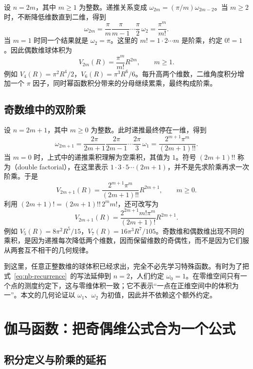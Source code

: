 \documentclass[UTF8]{ctexart}
\begin{document}
设 $n=2m$，其中 $m\geq1$ 为整数。递推关系变成 $\omega_{2m}=(\pi/m)\omega_{2m-2}$。当 $m\geq2$ 时，不断降低维数直到二维，得到
\[
  \omega_{2m}=\frac{\pi}{m}\frac{\pi}{m-1}\cdots
  \frac{\pi}{2}\,\omega_2=\frac{\pi^m}{m!}.
\]
当 $m=1$ 时同一个结果就是 $\omega_2=\pi$。这里的 $m!=1\cdot2\cdots m$ 是阶乘，约定 $0!=1$。因此偶数维球体积为
\begin{equation}\label{eq:nb-even}
  V_{2m}(R)=\frac{\pi^m}{m!}R^{2m},\qquad m\geq1.
\end{equation}
例如 $V_4(R)=\pi^2R^4/2$，$V_6(R)=\pi^3R^6/6$。每升高两个维数，二维角度积分增加一个 $\pi$ 因子，同时幂函数积分带来的分母继续累乘，最终构成阶乘。

\subsection{奇数维中的双阶乘}

设 $n=2m+1$，其中 $m\geq0$ 为整数。此时递推最终停在一维，得到
\[
  \omega_{2m+1}
  =\frac{2\pi}{2m+1}\frac{2\pi}{2m-1}\cdots
   \frac{2\pi}{3}\,\omega_1
  =\frac{2^{m+1}\pi^m}{(2m+1)!!}.
\]
当 $m=0$ 时，上式中的递推乘积理解为空乘积，其值为 $1$。符号 $(2m+1)!!$ 称为（double factorial），在这里表示 $1\cdot3\cdot5\cdots(2m+1)$，并不是先求阶乘再求一次阶乘。于是
\begin{equation}\label{eq:nb-odd}
  V_{2m+1}(R)=\frac{2^{m+1}\pi^m}{(2m+1)!!}R^{2m+1},
  \qquad m\geq0.
\end{equation}
利用 $(2m+1)!=(2m+1)!!\,2^m m!$，还可改写为
\[
  V_{2m+1}(R)=\frac{2^{2m+1}m!\pi^m}{(2m+1)!}R^{2m+1}.
\]
例如 $V_5(R)=8\pi^2R^5/15$，$V_7(R)=16\pi^3R^7/105$。奇数维和偶数维出现不同的乘积，是因为递推每次降低两个维数，因而保留维数的奇偶性，而不是因为它们服从两套互不相干的几何规律。

到这里，任意正整数维的球体积已经求出，完全不必先学习特殊函数。有时为了把式~\eqref{eq:nb-recurrence}~的写法延伸到 $n=2$，人们约定 $\omega_0=1$。在零维空间只有一个点的测度约定下，这与零维体积一致；它不表示“一点在正维空间中的体积为一”。本文的几何论证以 $\omega_1$、$\omega_2$ 为初值，因此并不依赖这个额外约定。

\section{伽马函数：把奇偶维公式合为一个公式}
\label{sec:nb-gamma}

\subsection{积分定义与阶乘的延拓}
\end{document}
